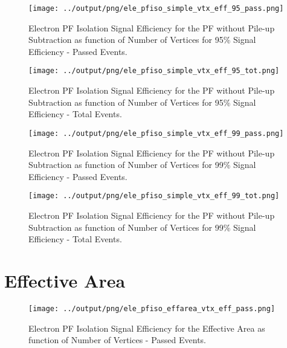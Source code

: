 \documentclass[11pt]{book}
\begin{document}
\begin{figure}[htb]
\centering
\texttt{[image: ../output/png/ele\_pfiso\_simple\_vtx\_eff\_95\_pass.png]}
\caption{Electron PF Isolation Signal Efficiency for the PF without Pile-up Subtraction as function of Number of Vertices for 95\% Signal Efficiency - Passed Events.}
\label{fig:ele_pfiso_vtx_eff_simple_eff_95_pass}
\end{figure}

\begin{figure}[htb]
\centering
\texttt{[image: ../output/png/ele\_pfiso\_simple\_vtx\_eff\_95\_tot.png]}
\caption{Electron PF Isolation Signal Efficiency for the PF without Pile-up Subtraction as function of Number of Vertices for 95\% Signal Efficiency - Total Events.}
\label{fig:ele_pfiso_vtx_eff_simple_eff_95_tot}
\end{figure}

\begin{figure}[htb]
\centering
\texttt{[image: ../output/png/ele\_pfiso\_simple\_vtx\_eff\_99\_pass.png]}
\caption{Electron PF Isolation Signal Efficiency for the PF without Pile-up Subtraction as function of Number of Vertices for 99\% Signal Efficiency - Passed Events.}
\label{fig:ele_pfiso_vtx_eff_simple_eff_99_pass}
\end{figure}

\begin{figure}[htb]
\centering
\texttt{[image: ../output/png/ele\_pfiso\_simple\_vtx\_eff\_99\_tot.png]}
\caption{Electron PF Isolation Signal Efficiency for the PF without Pile-up Subtraction as function of Number of Vertices for 99\% Signal Efficiency - Total Events.}
\label{fig:ele_pfiso_vtx_eff_simple_eff_99_tot}
\end{figure}




\clearpage

\section{Effective Area}
\begin{figure}[htb]
\centering
\texttt{[image: ../output/png/ele\_pfiso\_effarea\_vtx\_eff\_pass.png]}
\caption{Electron PF Isolation Signal Efficiency for the Effective Area as function of Number of Vertices - Passed Events.}
\label{fig:ele_pfiso_vtx_eff_effarea_pass}
\end{figure}
\end{document}

